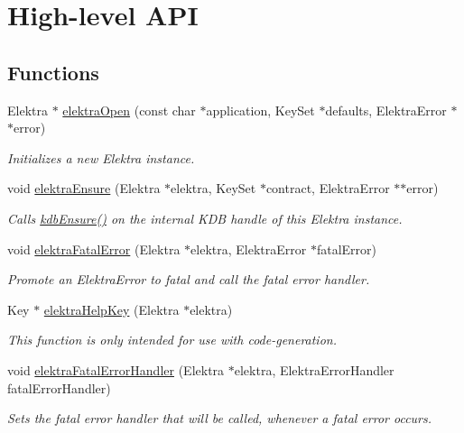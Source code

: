 \hypertarget{group__highlevel}{}\section{High-\/level A\+PI}
\label{group__highlevel}
\subsection*{Functions}
\begin{DoxyCompactItemize}
\item 
Elektra $\ast$ \hyperlink{group__highlevel_ga267ac9c5ac023d28d4df306933ff5a7b}{elektra\+Open} (const char $\ast$application, Key\+Set $\ast$defaults, Elektra\+Error $\ast$$\ast$error)
\begin{DoxyCompactList}\small\item\em Initializes a new Elektra instance. \end{DoxyCompactList}\item 
void \hyperlink{group__highlevel_ga43b04fb111d633be5e89910c5f7461a6}{elektra\+Ensure} (Elektra $\ast$elektra, Key\+Set $\ast$contract, Elektra\+Error $\ast$$\ast$error)
\begin{DoxyCompactList}\small\item\em Calls \hyperlink{group__kdb_ga0955373877575fa21275891518f8ab31}{kdb\+Ensure()} on the internal K\+DB handle of this Elektra instance. \end{DoxyCompactList}\item 
void \hyperlink{group__highlevel_ga57d87ff6defe4db402b772ab2a0025f9}{elektra\+Fatal\+Error} (Elektra $\ast$elektra, Elektra\+Error $\ast$fatal\+Error)
\begin{DoxyCompactList}\small\item\em Promote an Elektra\+Error to fatal and call the fatal error handler. \end{DoxyCompactList}\item 
Key $\ast$ \hyperlink{group__highlevel_ga5d1462351e703f59b8faf57955219eb8}{elektra\+Help\+Key} (Elektra $\ast$elektra)
\begin{DoxyCompactList}\small\item\em This function is only intended for use with code-\/generation. \end{DoxyCompactList}\item 
void \hyperlink{group__highlevel_ga496441e9e1dd80ed14a239dfc4c08c40}{elektra\+Fatal\+Error\+Handler} (Elektra $\ast$elektra, Elektra\+Error\+Handler fatal\+Error\+Handler)
\begin{DoxyCompactList}\small\item\em Sets the fatal error handler that will be called, whenever a fatal error occurs. \end{DoxyCompactList}\item 

\end{DoxyCompactItemize}
